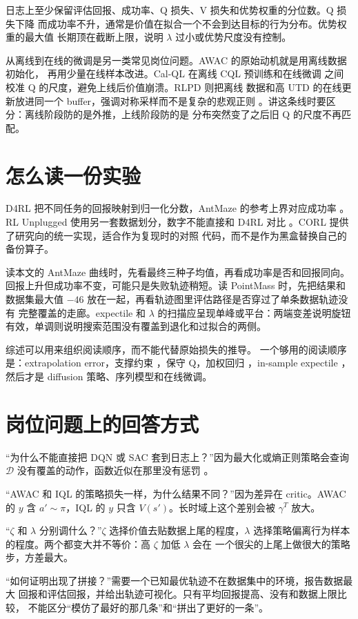 \documentclass[10pt,twocolumn,a4paper]{ctexart}
\begin{document}
日志上至少保留评估回报、成功率、Q 损失、V 损失和优势权重的分位数。Q 损失下降
而成功率不升，通常是价值在拟合一个不会到达目标的行为分布。优势权重的最大值
长期顶在截断上限，说明 $\lambda$ 过小或优势尺度没有控制。

从离线到在线的微调是另一类常见岗位问题。AWAC 的原始动机就是用离线数据初始化，
再用少量在线样本改进\citep{nair2020awac}。Cal-QL 在离线 CQL 预训练和在线微调
之间校准 Q 的尺度，避免上线后价值崩溃\citep{nakamoto2023calql}。RLPD 则把离线
数据和高 UTD 的在线更新放进同一个 buffer，强调对称采样而不是复杂的悲观正则
\citep{ball2023rlpd}。讲这条线时要区分：离线阶段防的是外推，上线阶段防的是
分布突然变了之后旧 Q 的尺度不再匹配。

\section{怎么读一份实验}
D4RL 把不同任务的回报映射到归一化分数，AntMaze 的参考上界对应成功率
\citep{fu2020d4rl}。RL Unplugged 使用另一套数据划分，数字不能直接和 D4RL 对比
\citep{gulcehre2020rlu}。CORL 提供了研究向的统一实现，适合作为复现时的对照
代码，而不是作为黑盒替换自己的备份算子\citep{tarasov2022corl}。

读本文的 AntMaze 曲线时，先看最终三种子均值，再看成功率是否和回报同向。
回报上升但成功率不变，可能只是失败轨迹稍短。读 PointMass 时，先把结果和
数据集最大值 $-46$ 放在一起，再看轨迹图里评估路径是否穿过了单条数据轨迹没有
完整覆盖的走廊。expectile 和 $\lambda$ 的扫描应呈现单峰或平台：两端变差说明旋钮
有效，单调则说明搜索范围没有覆盖到退化和过拟合的两侧。

综述可以用来组织阅读顺序，而不能代替原始损失的推导\citep{prudencio2023survey}。
一个够用的阅读顺序是：extrapolation error\citep{fujimoto2019bcq}，支撑约束
\citep{kumar2019bear}，保守 Q\citep{kumar2020cql}，加权回归
\citep{peng2019awr,nair2020awac,wang2020crr}，in-sample expectile
\citep{kostrikov2022iql}，然后才是 diffusion 策略、序列模型和在线微调。

\section{岗位问题上的回答方式}
“为什么不能直接把 DQN 或 SAC 套到日志上？”因为最大化或熵正则策略会查询
$\mathcal{D}$ 没有覆盖的动作，函数近似在那里没有惩罚
\citep{mnih2015dqn,haarnoja2018sac,fujimoto2019bcq}。

“AWAC 和 IQL 的策略损失一样，为什么结果不同？”因为差异在 critic。AWAC 的
$y$ 含 $a'\sim\pi$，IQL 的 $y$ 只含 $V(s')$。长时域上这个差别会被 $\gamma^{T}$
放大。

“$\zeta$ 和 $\lambda$ 分别调什么？”$\zeta$ 选择价值去贴数据上尾的程度，$\lambda$
选择策略偏离行为样本的程度。两个都变大并不等价：高 $\zeta$ 加低 $\lambda$ 会在
一个很尖的上尾上做很大的策略步，方差最大。

“如何证明出现了拼接？”需要一个已知最优轨迹不在数据集中的环境，报告数据最大
回报和评估回报，并给出轨迹可视化。只有平均回报提高、没有和数据上限比较，
不能区分“模仿了最好的那几条”和“拼出了更好的一条”。



\end{document}
